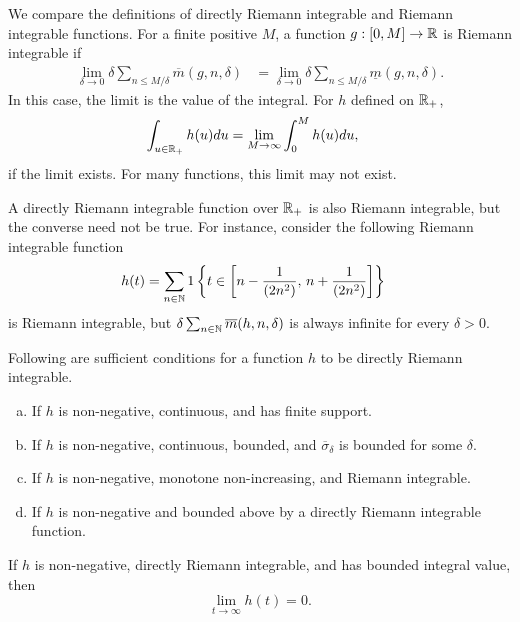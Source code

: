 \documentclass[a4paper,10pt,english]{article}
\begin{document}
\begin{shaded*}
We compare the definitions of directly Riemann integrable and Riemann integrable functions. 
For a finite positive $M$, a function $g: [0, M] \rightarrow \mathbb{R} $ is Riemann integrable if 
\begin{align*}
\lim_{\delta \to 0} \delta \sum_{n \leq M/\delta}\overline{m}(g,n,\delta) &=\lim_{\delta \to 0} \delta \sum_{n \leq M/\delta}\underline{m}(g,n,\delta). 
\end{align*} 
In this case, the limit is the value of the integral. 
For $h$ defined on $\mathbb{R}_+$, 
\begin{align*}
\int_{u \in \mathbb{R}_+}h(u)du &= \lim_{M \rightarrow \infty}\int_{0}^{M}h(u)du, 
\end{align*}
if the limit exists. For many functions, this limit may not exist.

A directly Riemann integrable function over $\mathbb{R}_+$ is also Riemann integrable, but the converse need not be true. 
For instance, consider the following Riemann integrable function
\begin{align*}
h(t) &= \sum_{n\in\mathbb{N}}1\left\{t \in \left[n-\frac{1}{(2n^2)},\,n+\frac{1}{(2n^2)}\right]\right\}
\end{align*} is Riemann integrable, but $\delta \sum_{n \in \mathbb{N}}\overline{m}(h,n,\delta)$ is always infinite for every $\delta>0.$
\end{shaded*}
\begin{prop}%
Following are sufficient conditions for a function $h$ to be directly Riemann integrable.
  \begin{enumerate}[(a)]
  \item If $h$ is non-negative, continuous, and has finite support. 
  \item If $h$ is non-negative, continuous, bounded, and $\overline{\sigma}_{\delta}$ is bounded for some $\delta$.  
  \item If $h$ is non-negative, monotone non-increasing, and Riemann integrable. 
  \item If $h$ is non-negative and bounded above by a directly Riemann integrable function.
  \end{enumerate}
\end{prop}
\begin{prop} If $h$ is non-negative, directly Riemann integrable, and has bounded integral value, then 
\begin{equation*}
\lim_{t \rightarrow \infty} h(t)=0.
\end{equation*}
\end{prop}
\end{document}
